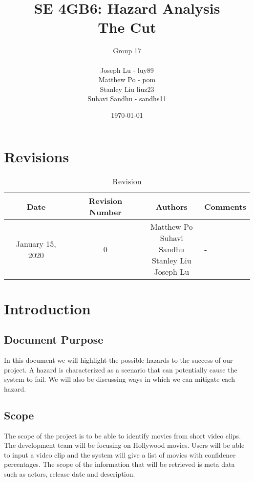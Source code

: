 \documentclass{article}
\title{SE 4GB6: Hazard Analysis\\The Cut}
\author{Group 17\\\\
            Joseph Lu - luy89 \\
            Matthew Po - pom \\
            Stanley Liu  liuz23 \\
            Suhavi Sandhu - sandhs11
            }
\date{\today}
\begin{document}
\maketitle
\newpage
\tableofcontents
\listoffigures
\listoftables
\newpage

\section{Revisions}
\begin{table}[H]
    \caption{Revision}
    \centering
    \begin{tabularx}{\textwidth}{|c|c|c|X|}
        \hline
        Date & Revision Number & Authors & Comments \\ 
        \hline
        January 15, 2020 & 0 & \makecell{Matthew Po\\Suhavi Sandhu\\Stanley Liu\\Joseph Lu} & -\\ 
        \hline
    \end{tabularx}
    \label{tab:Revision}
\end{table}

\newpage

\section{Introduction}

\subsection{Document Purpose}

In this document we will highlight the possible hazards to the success of our project. A hazard is characterized as a scenario that can potentially cause the system to fail. We will also be discussing ways in which we can mitigate each hazard.

\subsection{Scope}

The scope of the project is to be able to identify movies from short video clips. The development team will be focusing on Hollywood movies. Users will be able to input a video clip and the system will give a list of movies with confidence percentages. The scope of the information that will be retrieved is meta data such as actors, release date and description.
\end{document}
